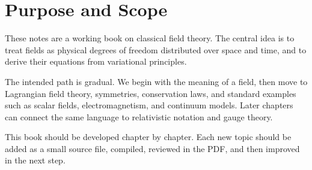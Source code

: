 \section*{Purpose and Scope}

These notes are a working book on classical field theory. The central idea is
to treat fields as physical degrees of freedom distributed over space and time,
and to derive their equations from variational principles.

The intended path is gradual. We begin with the meaning of a field, then move to
Lagrangian field theory, symmetries, conservation laws, and standard examples
such as scalar fields, electromagnetism, and continuum models. Later chapters
can connect the same language to relativistic notation and gauge theory.

\begin{remarkbox}
This book should be developed chapter by chapter. Each new topic should be
added as a small source file, compiled, reviewed in the PDF, and then improved
in the next step.
\end{remarkbox}
